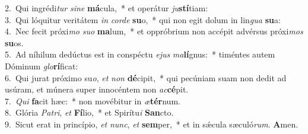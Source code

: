 {2.~}Qui ingrédi\textit{tur} \textit{si}\textit{ne} \textbf{má}cula,~* et operátur \textit{ju}\textbf{stí}tiam:\\
{3.~}Qui lóquitur veritátem \textit{in} \textit{cor}\textit{de} \textbf{su}o,~* qui non egit dolum in lin\textit{gua} \textbf{su}a:\\
{4.~}Nec fecit próxi\textit{mo} \textit{su}\textit{o} \textbf{ma}lum,~* et oppróbrium non accépit advérsus próxi\textit{mos} \textbf{su}os.\\
{5.~}Ad níhilum dedúctus est in conspéctu \textit{e}\textit{jus} \textit{ma}\textbf{lí}gnus:~* timéntes autem Dóminum \textit{glo}\textbf{rí}ficat:\\
{6.~}Qui jurat próximo su\textit{o}, \textit{et} \textit{non} \textbf{dé}cipit,~* qui pecúniam suam non dedit ad usúram, et múnera super innocéntem non \textit{ac}\textbf{cé}pit.\\
{7.~}\textit{Qui} \textbf{fa}cit hæc:~* non movébitur in \textit{æ}\textbf{tér}num.\\
{8.~}Glória \textit{Pa}\textit{tri}, \textit{et} \textbf{Fí}lio,~* et Spirítu\textit{i} \textbf{San}cto.\\
{9.~}Sicut erat in princípio, \textit{et} \textit{nunc}, \textit{et} \textbf{sem}per,~* et in sǽcula sæculó\textit{rum}. \textbf{A}men.\\
